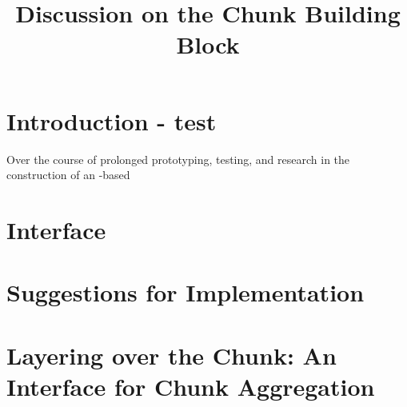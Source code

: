 \documentclass[10pt, a4paper]{article}
\begin{document}
\title{Discussion on the Chunk Building Block}
  
\maketitle

\section{Introduction - test} %

Over the course of prolonged prototyping, testing, and research in the construction of an \R{}-based 

\section{Interface}
\section{Suggestions for Implementation}
\section{Layering over the Chunk: An Interface for Chunk Aggregation}

\end{document}
